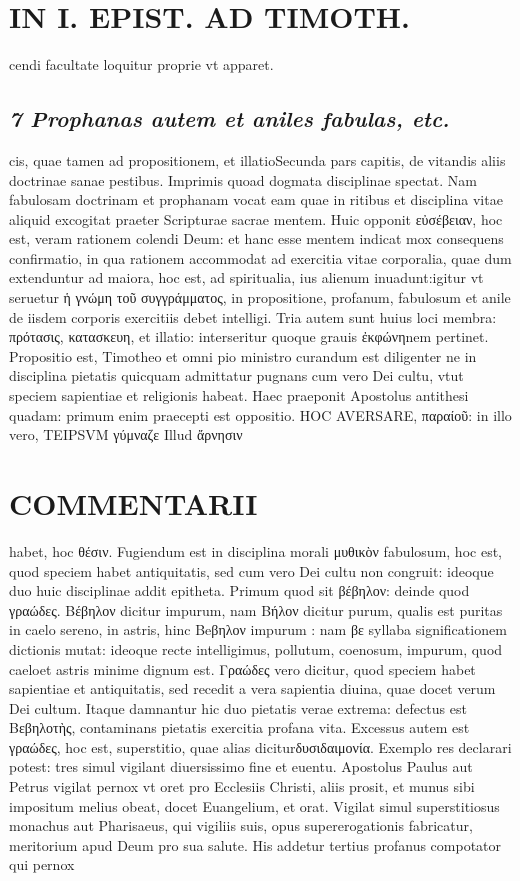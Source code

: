 \documentclass{article}
\begin{document}
\begin{pages}
\section*{IN I. EPIST. AD TIMOTH. }
\marginpar{[ p.95 ]}\pstart cendi facultate loquitur proprie vt apparet.  \pend
{}
{}
\subsection*{\textit{7 Prophanas autem et aniles fabulas, etc. }}\pstart cis, quae tamen ad propositionem, et illatioSecunda pars capitis, de vitandis aliis doctrinae sanae pestibus. Imprimis quoad dogmata disciplinae spectat. Nam fabulosam doctrinam et prophanam vocat eam quae in ritibus et disciplina vitae aliquid excogitat praeter Scripturae sacrae mentem. Huic opponit εὐσέβειαν, hoc est, veram rationem colendi Deum: et hanc esse mentem indicat mox consequens confirmatio, in qua rationem accommodat ad exercitia vitae corporalia, quae dum extenduntur ad maiora, hoc est, ad spiritualia, ius alienum inuadunt:igitur vt seruetur ἡ γνώμη τοῦ συγγράμματος, in propositione, profanum, fabulosum et anile de iisdem corporis exercitiis debet intelligi. Tria autem sunt huius loci membra: πρότασις, κατασκευη, et illatio: interseritur quoque grauis ἐκφώνηnem pertinet.  \pend\pstart Propositio est, Timotheo et omni pio ministro curandum est diligenter ne in disciplina pietatis quicquam admittatur pugnans cum vero Dei cultu, vtut speciem sapientiae et religionis habeat. Haec praeponit Apostolus antithesi quadam: primum enim praecepti est oppositio. HOC AVERSARE, παραίοῦ: in illo vero, TEIPSVM γύμναζε Illud ἄρνησιν  \pend
\section*{COMMENTARII }
\marginpar{[ p.96 ]}\pstart habet, hoc θέσιν. Fugiendum est in disciplina morali μυθικὸν fabulosum, hoc est, quod speciem habet antiquitatis, sed cum vero Dei cultu non congruit: ideoque duo huic disciplinae addit epitheta. Primum quod sit βέβηλον: deinde quod γραώδες. Βέβηλον dicitur impurum, nam Βήλον dicitur purum, qualis est puritas in caelo sereno, in astris, hinc Beβηλον impurum : nam βε syllaba significationem dictionis mutat: ideoque recte intelligimus, pollutum, coenosum, impurum, quod caeloet astris minime dignum est. Γραώδες vero dicitur, quod speciem habet sapientiae et antiquitatis, sed recedit a vera sapientia diuina, quae docet verum Dei cultum.  \pend\pstart Itaque damnantur hic duo pietatis verae extrema: defectus est Bεβηλοτὴς, contaminans pietatis exercitia profana vita. Excessus autem est γραώδες, hoc est, superstitio, quae alias diciturδυσιδαιμονία. Exemplo res declarari potest: tres simul vigilant diuersissimo fine et euentu. Apostolus Paulus aut Petrus vigilat pernox vt oret pro Ecclesiis Christi, aliis prosit, et munus sibi impositum melius obeat, docet Euangelium, et orat. Vigilat simul superstitiosus monachus aut Pharisaeus, qui vigiliis suis, opus supererogationis fabricatur, meritorium apud Deum pro sua salute. His addetur tertius profanus compotator qui pernox\pend

\end{pages}
\end{document}
